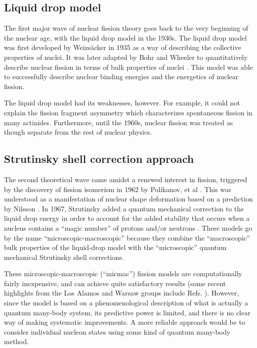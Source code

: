 \subsection{Liquid drop model}
The first major wave of nuclear fission theory goes back to the very beginning of the nuclear age, with the liquid drop model in the 1930s. The liquid drop model was first developed by Weizs\"acker in 1935 \cite{Weizsacker1935} as a way of describing the collective properties of nuclei. It was later adapted by Bohr and Wheeler to quantitatively describe nuclear fission in terms of bulk properties of nuclei \cite{Bohr1939}. This model was able to successfully describe nuclear binding energies and the energetics of nuclear fission.

The liquid drop model had its weaknesses, however. For example, it could not explain the fission fragment asymmetry which characterizes spontaneous fission in many actinides. Furthermore, until the 1960s, nuclear fission was treated as though separate from the rest of nuclear physics.%

\subsection{Strutinsky shell correction approach}
The second theoretical wave came amidst a renewed interest in fission, triggered by the discovery of fission isomerism in 1962 by Polikanov, et al \cite{Polikanov1962}. This was understood as a manifestation of nuclear shape deformation based on a prediction by Nilsson \cite{Nilsson1955}. In 1967, Strutinsky added a quantum mechanical correction to the liquid drop energy in order to account for the added stability that occurs when a nucleus contains a ``magic number'' of protons and/or neutrons \cite{Strutinsky1967, Strutinsky1968, Brack1972}. These models go by the name ``microscopic-macroscopic'' because they combine the ``macroscopic'' bulk properties of the liquid-drop model with the ``microscopic'' quantum mechanical Strutinsky shell corrections.

These microscopic-macroscopic (``micmac'') fission models are computationally fairly inexpensive, and can achieve quite satisfactory results (some recent highlights from the Los Alamos and Warsaw groups include Refs. \cite{Moller2015a,Moller2015b,Jachimowicz2013,Jachimowicz2017}). However, since the model is based on a phenomenological description of what is actually a quantum many-body system, its predictive power is limited, and there is no clear way of making systematic improvements. A more reliable approach would be to consider individual nucleon states using some kind of quantum many-body method. 

